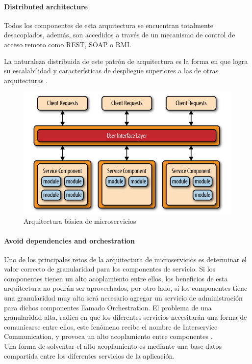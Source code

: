 \paragraph{Distributed architecture}
Todos los componentes de esta arquitectura se encuentran totalmente desacoplados, además, son accedidos a través de un mecanismo de control de acceso remoto como REST, SOAP o RMI.

La naturaleza distribuida de este patrón de arquitectura es la forma en que logra su escalabilidad y características de despliegue superiores a las de otras arquitecturas \citep{MarcoTeorico9}.

\begin{figure}[H]
	\centering
	\includegraphics[scale=.6]{Capitulo2/images/microservicios}
	\caption{Arquitectura básica de microservicios}
	\label{fig:microservicios}
\end{figure}

\paragraph{Avoid dependencies and orchestration}
Uno de los principales retos de la arquitectura de microservicios es determinar el valor correcto de granularidad para los componentes de servicio. Si los componentes tienen un alto acoplamiento entre ellos, los beneficios de esta arquitectura no podrán ser aprovechados, por otro lado, si los componentes tiene una granularidad muy alta será necesario agregar un servicio de administración para dichos componentes llamado Orchestration. El problema de una granularidad alta, radica en que los diferentes servicios necesitarán una forma de comunicarse entre ellos, este fenómeno recibe el nombre de Interservice Communication, y provoca un alto acoplamiento entre componentes \citep{MarcoTeorico9}.
\\
Una forma de solventar el alto acoplamiento es mediante una base datos compartida entre los diferentes servicios de la aplicación.

